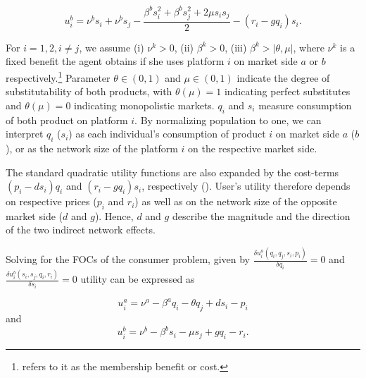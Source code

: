 \documentclass[12pt,a4paper]{scrreprt}
\begin{document}
\begin{equation}\label{4.2}
u_i^b = \nu^b s_i + \nu^b s_j -\frac{\beta^b s^2_i+ \beta^b s^2_j+2 \mu s_i s_j}{2}-(r_i-g q_i)s_i.
\end{equation}

For $i=1,2, i \neq j$, we assume (i) $\nu^k > 0$, (ii) $\beta^k > 0$, (iii) $\beta^k>\vert\theta,\mu\vert$, where $\nu^k$ is a fixed benefit the agent obtains if she uses platform $i$ on market side $a$ or $b$ respectively.\footnote{\cite{weyl_price_2010} refers to it as the membership benefit or cost.} Parameter $\theta \in (0,1)$ and $\mu \in (0,1)$ indicate the degree of substitutability of both products, with $\theta (\mu) = 1$ indicating perfect substitutes and $\theta (\mu) = 0$ indicating monopolistic markets. $q_i$ and $s_i$ measure consumption of both product on platform $i$. By normalizing  population to one, we can interpret $q_i$ ($s_i$) as each individual’s consumption of product $i$ on market side $a$ ($b$), or as the network size of the platform $i$ on the respective market side.

The standard quadratic utility functions are also expanded by the cost-terms $(p_i-d s_i)q_i$ and $(r_i-g q_i)s_i$, respectively (\cite{kind_business_2009}). User's utility therefore depends on respective prices ($p_i$ and $r_i$) as well as on the network size of the opposite market side ($d$ and $g$). Hence, $d$ and $g$ describe the magnitude and the direction of the two indirect network effects. 

Solving for the FOCs of the consumer problem, given by $\frac{\delta u_i^a(q_i,q_j,s_i,p_i)}{\delta q_i}=0$ and  $\frac{\delta u_i^b(s_i,s_j,q_i,r_i)}{\delta s_i}=0$ utility can be expressed as

\begin{equation}\label{utility_a}
u_i^a = \nu^a-\beta^a q_i - \theta q_j +ds_i - p_i
\end{equation}
and
\begin{equation}\label{utility_b}
u_i^b=\nu^b-\beta^b s_i - \mu s_j +gq_i - r_i.
\end{equation} 
\end{document}
